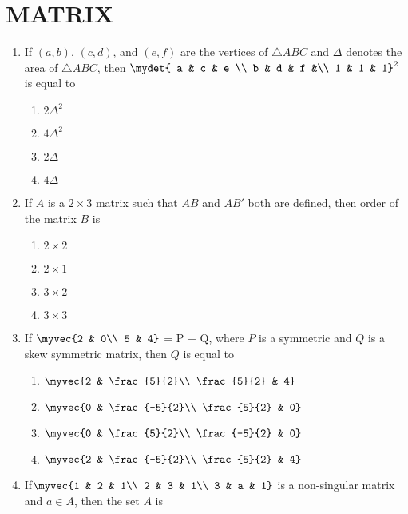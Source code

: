 \documentclass{article}
\begin{document}
\section{MATRIX}
\begin{enumerate}
\item  If $(a, b)$, $(c, d)$, and $(e, f)$ are the vertices of $\triangle ABC$ and $\Delta$ denotes the area of $\triangle ABC$, then $\mydet
{ a & c & e \\
 b & d & f &\\
 1 & 1 & 1}^2 $ is equal to
\begin{enumerate}
\item  $2\Delta^2$
\item $4\Delta^2$
\item $2\Delta$
\item $4\Delta$
\end{enumerate}
\item If $A$ is a $2\times 3$ matrix such that $AB$ and $AB'$ both are defined, then order of the matrix $B$ is
	\begin{enumerate}
		\item $2\times2$
		\item $2\times1$
		\item $3\times2$
		\item $3\times3$
	\end{enumerate}
\item If $\myvec
	{2 & 0\\
        5 & 4}$ = P + Q,  where $P$ is a symmetric and $Q$ is a skew symmetric matrix, then $Q$ is equal to
		\begin{enumerate}
			\item $\myvec
				{2 & \frac{5}{2}\\
				\frac{5}{2} & 4}$
			\item $\myvec
				{0 & \frac{-5}{2}\\
				\frac{5}{2} & 0}$
			\item $\myvec
				{0 & \frac{5}{2}\\
				\frac{-5}{2} & 0}$
			\item $\myvec
				{2 & \frac{-5}{2}\\
				\frac{5}{2} & 4}$
		\end{enumerate}
\item  If$\myvec
	       {1 & 2 & 1\\
		2 & 3 & 1\\
		3 & a & 1}$  is a non-singular matrix and $a \in A$, then the set $A$ is
		\begin{enumerate}

\end{enumerate}
\end{enumerate}
\end{document}
